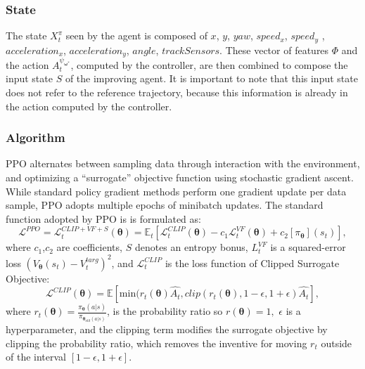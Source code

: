 \subsubsection{State}
\label{ppostate}
The state $X^{\pi}_t$ seen by the  agent is composed of $x$, $y$, $yaw$, $speed_x$, $speed_y$ , $acceleration_x$, $acceleration_y$, $angle$, $trackSensors.$ These vector of features $\Phi$ and the action $A^{\psi_{\boldsymbol \omega^*}}_t$, computed by the controller, are then combined to compose the input state $S$ of the improving agent. It is important to note that this input state does not refer to the reference trajectory, because this information is already in the action computed by the controller.



\subsubsection{Algorithm}

PPO alternates between sampling data through interaction with the environment, and optimizing a “surrogate” objective function using stochastic gradient ascent. While standard policy gradient methods perform one gradient update per data sample, PPO adopts multiple epochs of minibatch updates. 
The standard function adopted by PPO is is formulated as:
\begin{equation}
    \mathcal{L}^{PPO} = \mathcal{L}_t^{CLIP+VF+S}(\boldsymbol \theta) = \mathbb{E}_t\left[\mathcal{L}^{CLIP}_t(\boldsymbol \theta) -c_1 \mathcal{L}_t^{VF}(\boldsymbol \theta) + c_2[\pi_{\boldsymbol \theta}](s_t)\right],
\end{equation}
where $c_1$,$c_2$ are coefficients, $S$ denotes an entropy bonus, $L_t^{VF}$ is a squared-error loss $\left(V_{\boldsymbol \theta}(s_t)-V_t^{targ}\right)^2$, and $\mathcal{L}^{CLIP}_t$ is the loss function of Clipped Surrogate Objective:
\begin{equation}
    \mathcal{L}^{CLIP}(\boldsymbol \theta) = \mathbb{E}\left[\text{min}(r_t(\boldsymbol \theta) \hat{A_t},clip(r_t(\boldsymbol \theta),1-\epsilon,1+\epsilon)\hat{A_t}\right],
\end{equation}
where $r_t(\boldsymbol \theta) = \frac{\pi_{\boldsymbol \theta}(a|s)}{\pi_{\boldsymbol \theta_{old}(a|s)}}$, is the probability ratio so $r(\boldsymbol \theta)=1,$ $\epsilon$ is a hyperparameter, and the clipping term modifies the surrogate objective by clipping the probability ratio, which removes the inventive for moving $r_t$ outside of the interval $[1-\epsilon,1+\epsilon]$.

